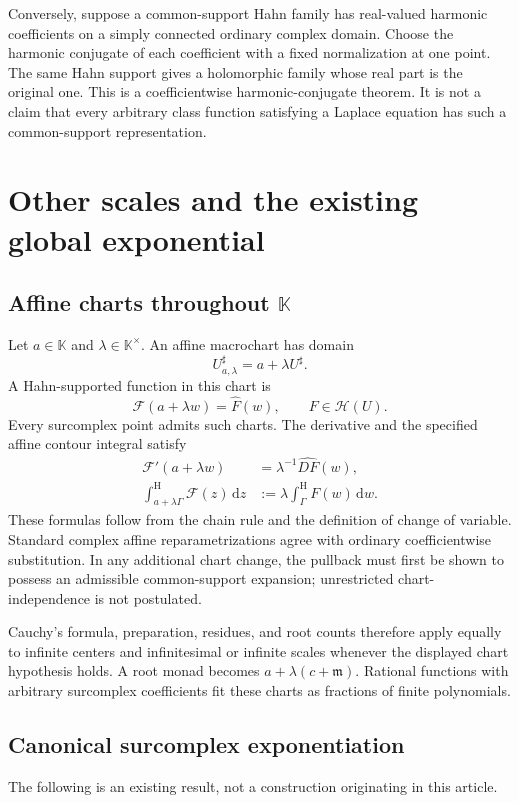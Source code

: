 \documentclass[11pt,oneside]{article}
\theoremstyle{definition}\newtheorem{definition}[theorem]{Definition}
\newcommand{\K}{\mathbb K}
\newcommand{\HH}{\mathcal H}
\newcommand{\mm}{\mathfrak m}
\newcommand{\dd}{\,\mathrm d}
\newcommand{\hatF}{\widehat F}
\newcommand{\htop}{\mathrm H}
\begin{document}
Conversely, suppose a common-support Hahn family has real-valued harmonic coefficients on a simply connected ordinary complex domain. Choose the harmonic conjugate of each coefficient with a fixed normalization at one point. The same Hahn support gives a holomorphic family whose real part is the original one. This is a coefficientwise harmonic-conjugate theorem. It is not a claim that every arbitrary class function satisfying a Laplace equation has such a common-support representation.

\section{Other scales and the existing global exponential}\label{sec:exp}
\subsection{Affine charts throughout \texorpdfstring{$\K$}{K}}
Let $a\in\K$ and $\lambda\in\K^\times$. An affine macrochart has domain
\[
 U^\sharp_{a,\lambda}=a+\lambda U^\sharp.
\]
A Hahn-supported function in this chart is
\[
 \mathcal F(a+\lambda w)=\hatF(w),\qquad F\in\HH(U).
\]
Every surcomplex point admits such charts. The derivative and the specified affine contour integral satisfy
\begin{align*}
 \mathcal F'(a+\lambda w)&=\lambda^{-1}\widehat{DF}(w),\\
 \int_{a+\lambda\Gamma}^{\htop}\mathcal F(z)\dd z
 &:=\lambda\int_\Gamma^{\htop}F(w)\dd w.
\end{align*}
These formulas follow from the chain rule and the definition of change of variable. Standard complex affine reparametrizations agree with ordinary coefficientwise substitution. In any additional chart change, the pullback must first be shown to possess an admissible common-support expansion; unrestricted chart-independence is not postulated.

Cauchy's formula, preparation, residues, and root counts therefore apply equally to infinite centers and infinitesimal or infinite scales whenever the displayed chart hypothesis holds. A root monad becomes $a+\lambda(c+\mm)$. Rational functions with arbitrary surcomplex coefficients fit these charts as fractions of finite polynomials.

\subsection{Canonical surcomplex exponentiation}
The following is an existing result, not a construction originating in this article.
\end{document}
